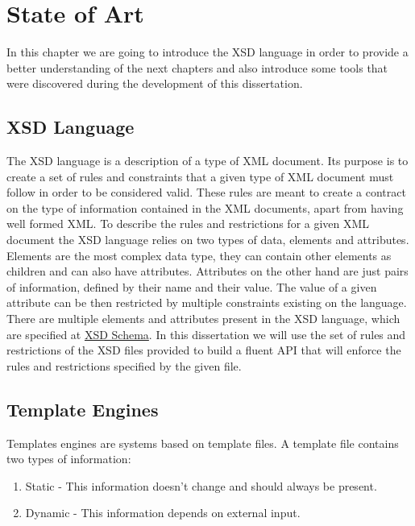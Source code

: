 \chapter{State of Art}
\label{cha:stateofart}

In this chapter we are going to introduce the \ac{XSD} language in order to provide a better understanding of the next chapters and also introduce some tools that were discovered during the development of this dissertation. 

\section{XSD Language} %
\label{sec:xsd}

The \ac{XSD} language is a description of a type of \ac{XML} document. Its purpose is to create a set of rules and constraints that a given type of \ac{XML} document must follow in order to be considered valid. These rules are meant to create a contract on the type of information contained in the \ac{XML} documents, apart from having well formed \ac{XML}. To describe the rules and restrictions for a given \ac{XML} document the \ac{XSD} language relies on two types of data, elements and attributes. Elements are the most complex data type, they can contain other elements as children and can also have attributes. Attributes on the other hand are just pairs of information, defined by their name and their value. The value of a given attribute can be then restricted by multiple constraints existing on the language. There are multiple elements and attributes present in the \ac{XSD} language, which are specified at \href{http://www.datypic.com/sc/xsd/s-xmlschema.xsd.html}{XSD Schema}. In this dissertation we will use the set of rules and restrictions of the \ac{XSD} files provided to build a fluent \ac{API} that will enforce the rules and restrictions specified by the given file.

\section{Template Engines}
\label{sec:templateengines}

Templates engines are systems based on template files. A template file contains two types of information:

\begin{enumerate}
\item Static - This information doesn't change and should always be present.
\item Dynamic - This information depends on external input.
\end{enumerate}

